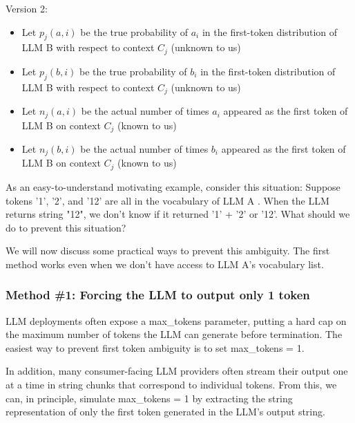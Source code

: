 \documentclass{article}
\begin{document}
Version 2:
\begin{itemize}
\item Let $\displaystyle p_{j}( a,i)$ be the true probability of $\displaystyle a_{i}$ in the first-token distribution of LLM B with respect to context $\displaystyle C_{j}$ (unknown to us)
\item Let $\displaystyle p_{j}( b,i)$ be the true probability of $\displaystyle b_{i}$ in the first-token distribution of LLM B with respect to context $\displaystyle C_{j}$ (unknown to us)
\item Let $\displaystyle n_{j}( a,i)$ be the actual number of times $\displaystyle a_{i}$ appeared as the first token of LLM B on context $\displaystyle C_{j}$ (known to us)
\item Let $\displaystyle n_{j}( b,i)$ be the actual number of times $\displaystyle b_{i}$ appeared as the first token of LLM B on context $\displaystyle C_{j}$ (known to us)
\end{itemize}



As an easy-to-understand motivating example, consider this situation: Suppose tokens '1', '2', and '12' are all in the vocabulary of LLM A . When the LLM returns string "12", we don't know if it returned '1' + '2' or '12'. What should we do to prevent this situation?



We will now discuss some practical ways to prevent this ambiguity. The first method works even when we don't have access to LLM A's vocabulary list.



\subsubsection{Method \#1: Forcing the LLM to output only 1 token}

LLM deployments often expose a max\_tokens parameter, putting a hard cap on the maximum number of tokens the LLM can generate before termination. The easiest way to prevent first token ambiguity is to set max\_tokens = 1.



In addition, many consumer-facing LLM providers often stream their output one at a time in string chunks that correspond to individual tokens. From this, we can, in principle, simulate max\_tokens = 1 by extracting the string representation of only the first token generated in the LLM's output string.
\end{document}
